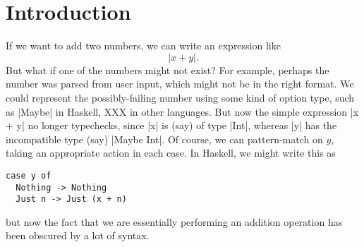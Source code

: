 \documentclass[sigplan,screen]{acmart}
\begin{document}



\maketitle

\section{Introduction}

If we want to add two numbers, we can write an expression like
\[ |x + y|. \] But what if one of the numbers might not exist?  For
example, perhaps the number was parsed from user input, which might
not be in the right format.  We could represent the possibly-failing
number using some kind of option type, such as |Maybe| in Haskell, XXX
in other languages.  But now the simple expression |x + y| no longer
typechecks, since |x| is (say) of type |Int|, whereas |y| has the
incompatible type (say) |Maybe Int|.  Of course, we can pattern-match
on $y$, taking an appropriate action in each case.  In Haskell, we
might write this as
\begin{verbatim}
case y of
  Nothing -> Nothing
  Just n -> Just (x + n)
\end{verbatim}
but now the fact that we are essentially performing an addition
operation has been obscured by a lot of syntax.
\end{document}

